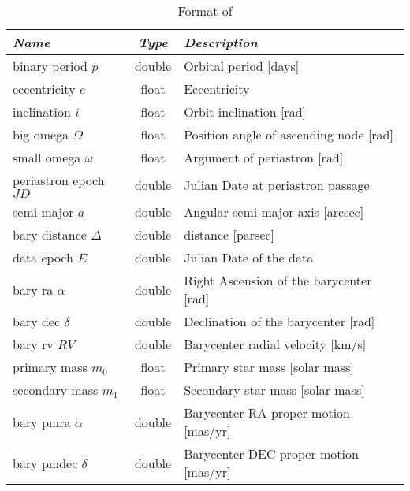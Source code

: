 \begin{table}[htb]
	\begin{tabularx}{\textwidth}{l|c|X}\toprule
	  \emph{Name}                    & \emph{Type} & \emph{Description}                     \\\midrule
	  binary period  $p$             & double      & Orbital period [days]                  \\%
	  eccentricity   $e$             & float       & Eccentricity                           \\%
	  inclination    $i$             & float       & Orbit inclination [rad]                \\%
	  big omega      $\Omega$        & float       & Position angle of ascending node [rad] \\%
	  small omega    $\omega$        & float       & Argument of periastron [rad]           \\%
	  periastron epoch $JD$          & double      & Julian Date at periastron passage      \\%
	  semi major     $a$             & double      & Angular semi-major axis [arcsec]       \\%
	  bary distance  $\Delta$        & double      & distance [parsec]                      \\%
	  data epoch     $E$             & double      & Julian Date of the data                \\%
	  bary ra        $\alpha$        & double      & Right Ascension of the barycenter [rad]\\%
	  bary dec       $\delta$        & double      & Declination of the barycenter  [rad]   \\%
	  bary rv        $RV$            & double      & Barycenter radial velocity [km/s]      \\%
	  primary mass   $m_0$           & float       & Primary star mass [solar mass]         \\%
	  secondary mass $m_1$           & float       & Secondary star mass [solar mass]       \\%
	  bary pmra      $\dot{\alpha}$  & double      & Barycenter RA proper motion [mas/yr]   \\%
	  bary pmdec     $\dot{\delta}$  & double      & Barycenter DEC proper motion [mas/yr]  \\\bottomrule
	\end{tabularx}
\caption{Format of }
\label{tab:StarCatalogues:BinaryOrbitalParameters:file}
\end{table}

